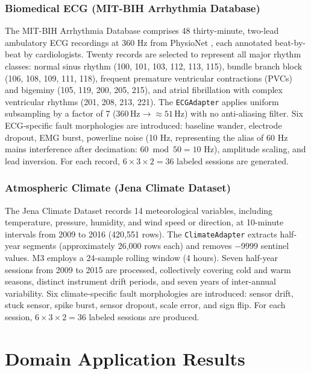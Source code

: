 \documentclass[conference]{IEEEtran}
\begin{document}
\subsubsection{Biomedical ECG (MIT-BIH Arrhythmia Database)}

The MIT-BIH Arrhythmia Database \cite{moody2001mitbih} comprises 48 thirty-minute, two-lead ambulatory ECG recordings at 360 Hz from PhysioNet \cite{goldberger2000physiobank}, each annotated beat-by-beat by cardiologists. Twenty records are selected to represent all major rhythm classes: normal sinus rhythm (100, 101, 103, 112, 113, 115), bundle branch block (106, 108, 109, 111, 118), frequent premature ventricular contractions (PVCs) and bigeminy (105, 119, 200, 205, 215), and atrial fibrillation with complex ventricular rhythms (201, 208, 213, 221). The \texttt{ECGAdapter} applies uniform subsampling by a factor of 7 ($360\,\text{Hz}\to\!\approx\!51\,\text{Hz}$) with no anti-aliasing filter. Six ECG-specific fault morphologies are introduced: baseline wander, electrode dropout, EMG burst, powerline noise (10 Hz, representing the alias of 60 Hz mains interference after decimation: $60 \bmod 50 = 10$ Hz), amplitude scaling, and lead inversion. For each record, $6 \times 3 \times 2 = 36$ labeled sessions are generated.

\subsubsection{Atmospheric Climate (Jena Climate Dataset)}

The Jena Climate Dataset \cite{jena_climate} records 14 meteorological variables, including temperature, pressure, humidity, and wind speed or direction, at 10-minute intervals from 2009 to 2016 (420,551 rows). The \texttt{ClimateAdapter} extracts half-year segments (approximately 26,000 rows each) and removes $-9999$ sentinel values. M3 employs a 24-sample rolling window (4 hours). Seven half-year sessions from 2009 to 2015 are processed, collectively covering cold and warm seasons, distinct instrument drift periods, and seven years of inter-annual variability. Six climate-specific fault morphologies are introduced: sensor drift, stuck sensor, spike burst, sensor dropout, scale error, and sign flip. For each session, $6 \times 3 \times 2 = 36$ labeled sessions are produced.



\section{Domain Application Results}
\end{document}
